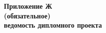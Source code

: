 \newpage


\begin{center}
  \textbf{Приложение Ж}\\
  \textbf{(обязательное)}\\
  \textbf{ведомость дипломного проекта}
\end{center}
\newpage

